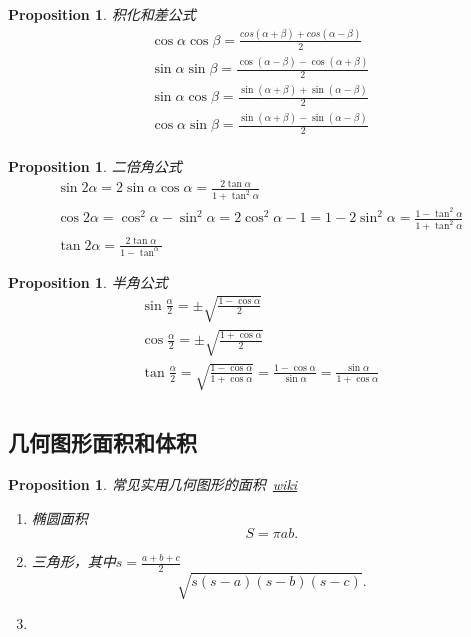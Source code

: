 \documentclass{article}
\newtheorem{proposition}[theorem]{Proposition}
\begin{document}
\begin{proposition}
\rm 积化和差公式
$$
\begin{array}{ll}
\cos\alpha \cos\beta = \frac{cos(\alpha+\beta)+cos(\alpha-\beta)}{2} \\
\sin\alpha \sin\beta = \frac{\cos(\alpha-\beta)-\cos(\alpha+\beta)}{2} \\ 
\sin\alpha \cos\beta = \frac{\sin(\alpha+\beta)+\sin(\alpha-\beta)}{2} \\
\cos\alpha \sin\beta = \frac{\sin(\alpha+\beta)-\sin(\alpha-\beta)}{2} \\ 
\end{array}
$$
\end{proposition}

\begin{proposition}
\rm 二倍角公式
$$
\begin{array}{ll}
\sin 2\alpha = 2\sin \alpha \cos \alpha = \frac{2\tan \alpha}{1 + \tan^2 \alpha}\\
\cos 2\alpha = \cos^2 \alpha - \sin^2 \alpha =  2\cos^2\alpha - 1 = 1 - 2\sin^2 \alpha  = \frac{1-\tan^2 \alpha}{1 + \tan^2\alpha}\\
\tan 2\alpha = \frac{2\tan\alpha}{1-\tan^\alpha}
\end{array}
$$
\end{proposition}

\begin{proposition}
\rm 半角公式
$$
\begin{array}{ll}
\sin\frac{\alpha}{2} = \pm \sqrt{\frac{1-\cos \alpha}{2}} \\
\cos\frac{\alpha}{2} = \pm \sqrt{\frac{1+\cos \alpha}{2}} \\
\tan\frac{\alpha}{2} = \sqrt{\frac{1-\cos \alpha}{1+\cos \alpha}} = \frac{1-\cos \alpha}{\sin \alpha} = \frac{\sin \alpha}{1+\cos \alpha}\\
\end{array}
$$
\end{proposition}

\subsection{几何图形面积和体积}

\begin{proposition}
\rm 常见实用几何图形的面积~\href{https://zh.wikipedia.org/wiki/\%E9\%9D\%A2\%E7\%A7\%AF}{wiki}
\begin{enumerate}
	\item 椭圆面积
	$$
	S = \pi ab.
	$$
	\item 三角形，其中$s = \frac{a+b+c}{2}$
	$$
	\sqrt{s(s-a)(s-b)(s-c)}.
	$$
	\item
\end{enumerate}
\end{proposition}
\end{document}
